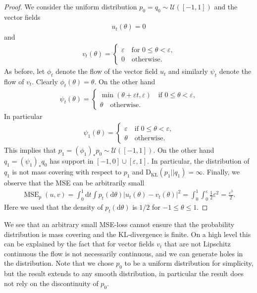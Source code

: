 \documentclass{article}
\theoremstyle{remark}
\newcommand{\mc}{\mathcal}
\newcommand{\eps}{\varepsilon}
\renewcommand{\d}{\mathrm{d}}
\newcommand{\KL}{\mathrm{D_{KL}}}
\DeclareMathOperator{\MSE}{MSE}
\begin{document}
\begin{proof}
We consider the uniform distribution 
$p_0=q_0\sim\mc{U}([-1,1])$ and the vector fields 
\begin{align}
    u_t(\theta) = 0
\end{align}
and
\begin{align}
    v_t(\theta) = 
    \begin{cases}
        \eps \quad \text{for $0\leq \theta< \eps$,}
        \\
        0 \quad \text{otherwise}.
    \end{cases}
\end{align} 
As before, let $\phi_t$ denote the flow of the vector field $u_t$ and similarly $\psi_t$ denote the flow of $v_t$.
Clearly $\phi_t (\theta)=\theta$.
On the other hand
\begin{align}
    \psi_t(\theta) 
    =
    \begin{cases}
        \min(\theta + \eps t , \eps)
        \quad \text{if $0\leq \theta<\eps$,}
        \\
        \theta \quad \text{otherwise}.
    \end{cases}
\end{align}
In particular
\begin{align}
    \psi_1(\theta) 
    =
    \begin{cases}
        \eps
        \quad \text{if $0\leq \theta<\eps$,}
        \\
        \theta \quad \text{otherwise}.
    \end{cases}
\end{align}
This implies that 
$p_1=(\phi_1)_\ast p_0 \sim \mc{U}([-1,1])$.
On the other hand 
$q_1 =(\psi_1)_\ast q_0$ has support
in $[-1,0]\cup [\eps, 1]$. In particular, the distribution of $q_1$ is not mass covering  with respect to $p_1$
and $\KL (p_1||q_1)=\infty$.
Finally, we observe that the MSE can be arbitrarily small
\begin{align}
 \MSE_p(u,v)=    \int_0^1 \d t \int p_t(\d \theta)
    |u_t(\theta)-v_t(\theta)|^2
    = 
    \int_0^1 \int_0^\eps \frac12
    \eps^2
    =\frac{\eps^3}{2}.
\end{align}
Here we used that the density of $p_t(\d \theta)$ is $1/2$ for $-1\leq \theta\leq 1$.
\end{proof}
We see that an arbitrary small MSE-loss cannot ensure that the probability distribution is mass covering and the KL-divergence is finite.
On a high level this can be explained by the fact that for 
vector fields $v_t$ that are not Lipschitz continuous the
flow is not necessarily continuous, and we can generate holes in the distribution. Note that we chose $p_0$ to be a  uniform distribution for simplicity, but the result extends
to any smooth distribution, in particular the result does not rely on the discontinuity of $p_0$.
\end{document}
